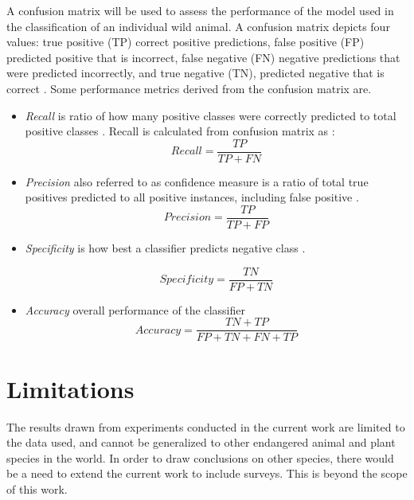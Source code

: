 A confusion matrix will be used to assess the performance of the model used in the classification of an individual wild animal. A confusion matrix depicts four values: true positive (TP) correct positive predictions, false positive (FP) predicted positive that is incorrect, false negative (FN) negative predictions that were predicted incorrectly, and true negative (TN), predicted negative that is correct \cite{sokolova2009systematic}. Some performance metrics derived from the confusion matrix are. 
\begin{itemize}
    \item \textit{Recall} is  ratio of how many positive classes were correctly predicted to total positive classes \cite{sokolova2009systematic}. Recall is calculated from confusion matrix as : 
    \begin{equation} \label{recall:eq}
         Recall  = \frac{TP}{TP+FN}
    \end{equation}{}
   
    \item \textit{Precision} also referred to as confidence measure is a ratio of total true positives predicted to all positive instances, including false positive \cite{baeza1999modern}.    
     \begin{equation}\label{pres:eq}
         Precision  = \frac{TP}{TP+FP}
     \end{equation}{}
     
    \item \textit{Specificity} is how best a classifier predicts negative class \cite{sokolova2009systematic}. 
    
        \begin{equation}
         Specificity  = \frac{TN}{FP+TN}
        \end{equation}{}
    \item \textit{Accuracy} overall performance of the classifier 
    \begin{equation}
         Accuracy  = \frac{TN+TP}{FP+TN+FN+TP}
        \end{equation}{}
    
\end{itemize}{}

\section{Limitations}
The results drawn from experiments conducted in the current work are limited to the data used, and cannot be generalized to other endangered animal and plant species in the world. In order to draw conclusions on other species, there would be a need to extend the current work to include surveys. This is beyond the scope of this work.   

